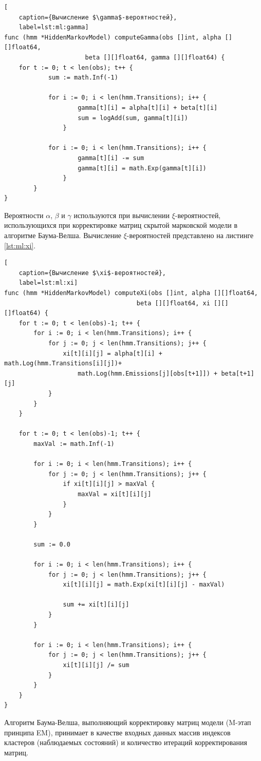 \begin{lstlisting}[
	caption={Вычисление $\gamma$-вероятностей},
	label=lst:ml:gamma]
func (hmm *HiddenMarkovModel) computeGamma(obs []int, alpha [][]float64, 
					  beta [][]float64, gamma [][]float64) {
	for t := 0; t < len(obs); t++ {
			sum := math.Inf(-1)
			
			for i := 0; i < len(hmm.Transitions); i++ {
					gamma[t][i] = alpha[t][i] + beta[t][i]
					sum = logAdd(sum, gamma[t][i])
				}
			
			for i := 0; i < len(hmm.Transitions); i++ {
					gamma[t][i] -= sum
					gamma[t][i] = math.Exp(gamma[t][i])
				}
		}
}
\end{lstlisting}
Вероятности $\alpha$, $\beta$ и $\gamma$ используются при вычислении $\xi$-вероятностей, использующихся при корректировке матриц скрытой марковской модели в алгоритме Баума-Велша. Вычисление $\xi$-вероятностей представлено на листинге  \ref{lst:ml:xi}.
\begin{lstlisting}[
	caption={Вычисление $\xi$-вероятностей},
	label=lst:ml:xi]
func (hmm *HiddenMarkovModel) computeXi(obs []int, alpha [][]float64, 
									beta [][]float64, xi [][][]float64) {
	for t := 0; t < len(obs)-1; t++ {
		for i := 0; i < len(hmm.Transitions); i++ {
			for j := 0; j < len(hmm.Transitions); j++ {
				xi[t][i][j] = alpha[t][i] + math.Log(hmm.Transitions[i][j])+
					math.Log(hmm.Emissions[j][obs[t+1]]) + beta[t+1][j]
			}
		}
	}
	
	for t := 0; t < len(obs)-1; t++ {
		maxVal := math.Inf(-1)
		
		for i := 0; i < len(hmm.Transitions); i++ {
			for j := 0; j < len(hmm.Transitions); j++ {
				if xi[t][i][j] > maxVal {
					maxVal = xi[t][i][j]
				}
			}
		}
		
		sum := 0.0
		
		for i := 0; i < len(hmm.Transitions); i++ {
			for j := 0; j < len(hmm.Transitions); j++ {
				xi[t][i][j] = math.Exp(xi[t][i][j] - maxVal)
				
				sum += xi[t][i][j]
			}
		}
		
		for i := 0; i < len(hmm.Transitions); i++ {
			for j := 0; j < len(hmm.Transitions); j++ {
				xi[t][i][j] /= sum
			}
		}
	}
}
\end{lstlisting}
Алгоритм Баума-Велша, выполняющий корректировку матриц модели (M-этап принципа EM), принимает в качестве входных данных массив индексов кластеров (наблюдаемых состояний) и количество итераций корректирования матриц. 

